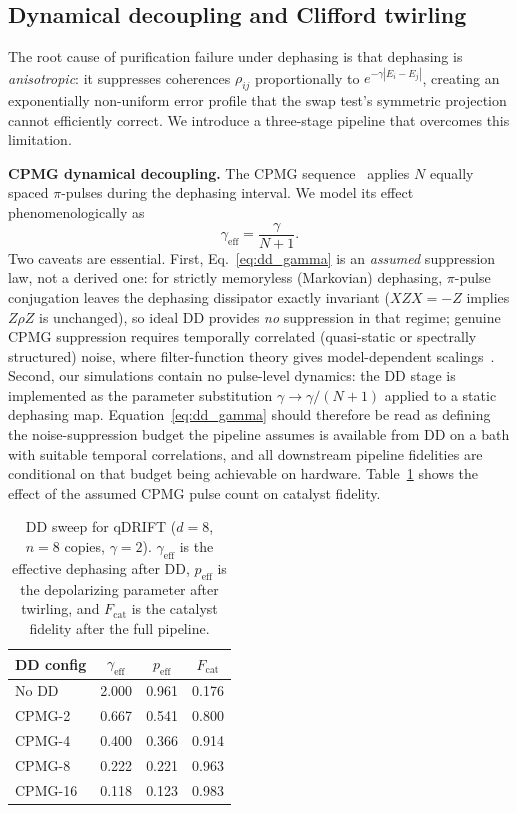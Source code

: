\documentclass[a4paper,twocolumn]{quantumarticle}
\newenvironment{ruledtabular}{}{}%
\providecommand{\colrule}{\hline}
\begin{document}
\subsection{Dynamical decoupling and Clifford twirling}
\label{sec:dd_twirl}

The root cause of purification failure under dephasing is that dephasing is \emph{anisotropic}: it suppresses coherences $\rho_{ij}$ proportionally to $e^{-\gamma|E_i - E_j|}$, creating an exponentially non-uniform error profile that the swap test's symmetric projection cannot efficiently correct.
We introduce a three-stage pipeline that overcomes this limitation.

\textbf{CPMG dynamical decoupling.}
The CPMG sequence~\cite{MeiboomGill1958,Viola1999} applies $N$ equally spaced $\pi$-pulses during the dephasing interval.
We model its effect phenomenologically as
\begin{equation}
\gamma_\mathrm{eff} = \frac{\gamma}{N + 1}.
\label{eq:dd_gamma}
\end{equation}
Two caveats are essential.
First, Eq.~\eqref{eq:dd_gamma} is an \emph{assumed} suppression law, not a derived one: for strictly memoryless (Markovian) dephasing, $\pi$-pulse conjugation leaves the dephasing dissipator exactly invariant ($XZX = -Z$ implies $Z\rho Z$ is unchanged), so ideal DD provides \emph{no} suppression in that regime; genuine CPMG suppression requires temporally correlated (quasi-static or spectrally structured) noise, where filter-function theory gives model-dependent scalings~\cite{Viola1999}.
Second, our simulations contain no pulse-level dynamics: the DD stage is implemented as the parameter substitution $\gamma \to \gamma/(N+1)$ applied to a static dephasing map.
Equation~\eqref{eq:dd_gamma} should therefore be read as defining the noise-suppression budget the pipeline assumes is available from DD on a bath with suitable temporal correlations, and all downstream pipeline fidelities are conditional on that budget being achievable on hardware.
Table~\ref{tab:dd_sweep} shows the effect of the assumed CPMG pulse count on catalyst fidelity.

\begin{table}[tb]
\caption{DD sweep for qDRIFT ($d = 8$, $n = 8$ copies, $\gamma = 2$). $\gamma_\mathrm{eff}$ is the effective dephasing after DD, $p_\mathrm{eff}$ is the depolarizing parameter after twirling, and $F_\mathrm{cat}$ is the catalyst fidelity after the full pipeline.}
\label{tab:dd_sweep}
\centering\footnotesize
\setlength{\tabcolsep}{3pt}
\begin{ruledtabular}
\begin{tabular}{lccc}
DD config & $\gamma_\mathrm{eff}$ & $p_\mathrm{eff}$ & $F_\mathrm{cat}$ \\
\colrule
No DD & 2.000 & 0.961 & 0.176 \\
CPMG-2 & 0.667 & 0.541 & 0.800 \\
CPMG-4 & 0.400 & 0.366 & 0.914 \\
CPMG-8 & 0.222 & 0.221 & 0.963 \\
CPMG-16 & 0.118 & 0.123 & 0.983 \\
\end{tabular}
\end{ruledtabular}
\end{table}
\end{document}
